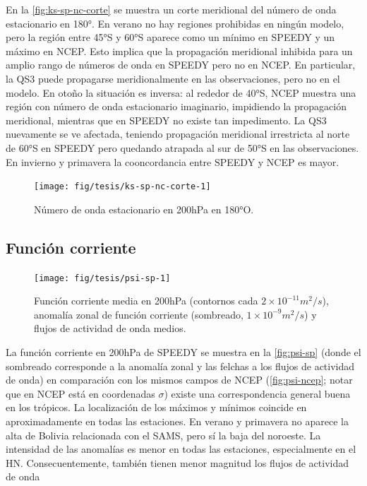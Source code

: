 \documentclass[spanish,a4paper,12pt,oneside]{book}
\begin{document}
En la \autoref{fig:ks-sp-nc-corte} se muestra un corte meridional del
número de onda estacionario en 180°. En verano no hay regiones
prohibidas en ningún modelo, pero la región entre 45°S y 60°S aparece
como un mínimo en SPEEDY y un máximo en NCEP. Esto implica que la
propagación meridional inhibida para un amplio rango de números de onda
en SPEEDY pero no en NCEP. En particular, la QS3 puede propagarse
meridionalmente en las observaciones, pero no en el modelo. En otoño la
situación es inversa: al rededor de 40°S, NCEP muestra una región con
número de onda estacionario imaginario, impidiendo la propagación
meridional, mientras que en SPEEDY no existe tan impedimento. La QS3
nuevamente se ve afectada, teniendo propagación meridional irrestricta
al norte de 60°S en SPEEDY pero quedando atrapada al sur de 50°S en las
observaciones. En invierno y primavera la cooncordancia entre SPEEDY y
NCEP es mayor.

\begin{figure}
\texttt{[image: fig/tesis/ks-sp-nc-corte-1]} \caption{Número de onda estacionario en 200hPa en 180°O.}\label{fig:ks-sp-nc-corte}
\end{figure}

\subsection{Función corriente}\label{funcion-corriente-2}

\begin{landscape}\begin{figure}

{\centering \texttt{[image: fig/tesis/psi-sp-1]} 

}

\caption{Función corriente media en 200hPa (contornos cada $2\times10^{-11}m^2/s$), anomalía zonal de función corriente (sombreado,  $1\times10^{-9}m^2/s$) y flujos de actividad de onda medios.}\label{fig:psi-sp}
\end{figure}
\end{landscape}

La función corriente en 200hPa de SPEEDY se muestra en la
\autoref{fig:psi-sp} (donde el sombreado corresponde a la anomalía zonal
y las felchas a los flujos de actividad de onda) en comparación con los
mismos campos de NCEP (\autoref{fig:psi-ncep}; notar que en NCEP está en
coordenadas \(\sigma\)) existe una correspondencia general buena en los
trópicos. La localización de los máximos y mínimos coincide en
aproximadamente en todas las estaciones. En verano y primavera no
aparece la alta de Bolivia relacionada con el SAMS, pero sí la baja del
noroeste. La intensidad de las anomalías es menor en todas las
estaciones, especialmente en el HN. Consecuentemente, también tienen
menor magnitud los flujos de actividad de onda
\end{document}
